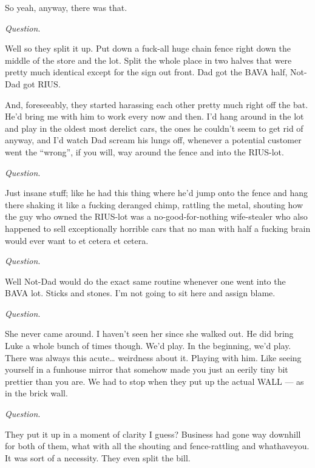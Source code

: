 So yeah, anyway, there was that.



{\em Question}.



Well so they split it up. Put down a fuck-all huge chain fence
right down the middle of the store and the lot. Split the whole
place in two halves that were pretty much identical except for the
sign out front. Dad got the BAVA half, Not-Dad got RIUS.

And, foreseeably, they started harassing each other pretty much
right off the bat. He'd bring me with him to work every now
and then. I'd hang around in the lot and play in the oldest
most derelict cars, the ones he couldn't seem to get rid of
anyway, and I'd watch Dad scream his lungs off, whenever a
potential customer went the ``wrong'', if you will, way
around the fence and into the RIUS-lot.



{\em Question}.



Just insane stuff; like he had this thing where he'd jump
onto the fence and hang there shaking it like a fucking deranged
chimp, rattling the metal, shouting how the guy who owned the
RIUS-lot was a no-good-for-nothing wife-stealer who also happened
to sell exceptionally horrible cars that no man with half a fucking
brain would ever want to et cetera et cetera.



{\em Question}.



Well Not-Dad would do the exact same routine whenever one went into
the BAVA lot. Sticks and stones. I'm not going to sit here and
assign blame.



{\em Question}.



She never came around. I haven't seen her since she walked
out. He did bring Luke a whole bunch of times though. We'd
play. In the beginning, we'd play. There was always this
acute{\ldots} weirdness about it. Playing with him. Like seeing
yourself in a funhouse mirror that somehow made you just an eerily
tiny bit prettier than you are. We had to stop when they put up the
actual WALL --- as in the brick wall.



{\em Question}.



They put it up in a moment of clarity I guess? Business had gone
way downhill for both of them, what with all the shouting and
fence-rattling and whathaveyou. It was sort of a necessity. They
even split the bill.



